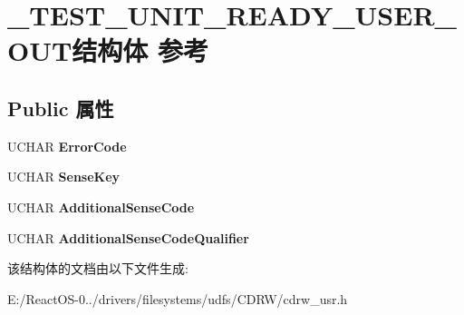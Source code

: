 \hypertarget{struct___t_e_s_t___u_n_i_t___r_e_a_d_y___u_s_e_r___o_u_t}{}\section{\+\_\+\+T\+E\+S\+T\+\_\+\+U\+N\+I\+T\+\_\+\+R\+E\+A\+D\+Y\+\_\+\+U\+S\+E\+R\+\_\+\+O\+U\+T结构体 参考}
\label{struct___t_e_s_t___u_n_i_t___r_e_a_d_y___u_s_e_r___o_u_t}
\subsection*{Public 属性}
\begin{DoxyCompactItemize}
\item 
\mbox{\label{struct___t_e_s_t___u_n_i_t___r_e_a_d_y___u_s_e_r___o_u_t_ac887bb26a2fcba9090882f811ae8cf09}} 
U\+C\+H\+AR {\bfseries Error\+Code}
\item 
\mbox{\label{struct___t_e_s_t___u_n_i_t___r_e_a_d_y___u_s_e_r___o_u_t_ab396d30f7520cd8ca747ca0d4b0837db}} 
U\+C\+H\+AR {\bfseries Sense\+Key}
\item 
\mbox{\label{struct___t_e_s_t___u_n_i_t___r_e_a_d_y___u_s_e_r___o_u_t_a4359ceb701b1a8a1cda857c94ed4066c}} 
U\+C\+H\+AR {\bfseries Additional\+Sense\+Code}
\item 
\mbox{\label{struct___t_e_s_t___u_n_i_t___r_e_a_d_y___u_s_e_r___o_u_t_a40dce62f7f3e416abb12e952947365a0}} 
U\+C\+H\+AR {\bfseries Additional\+Sense\+Code\+Qualifier}
\end{DoxyCompactItemize}


该结构体的文档由以下文件生成\+:\begin{DoxyCompactItemize}
\item 
E\+:/\+React\+O\+S-\/0../drivers/filesystems/udfs/\+C\+D\+R\+W/cdrw\+\_\+usr.\+h\end{DoxyCompactItemize}
